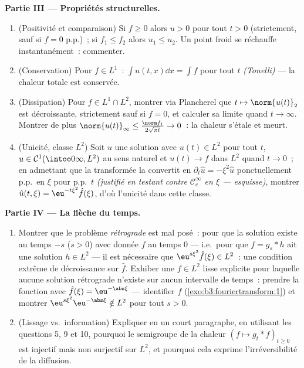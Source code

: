 \begin{problem}[{Problème du week-end --- $\partial_tu =
\partial^2_{xx}u$, résolue de bout en bout}]
\medskip
\noindent\textbf{Partie III --- Propriétés structurelles.}
\begin{enumerate}[resume]
  \item (Positivité et comparaison) Si $f \geq 0$ alors $u >
        0$ pour tout $t > 0$ (strictement, sauf si $f = 0$
        p.p.)~; si $f_1 \leq f_2$ alors $u_1 \leq u_2$. Un
        point froid se réchauffe instantanément~: commenter.
  \item (Conservation) Pour $f \in L^1$~: $\int u(t, x)\dd x =
        \int f$ pour tout $t$ \emph{(Tonelli)} --- la chaleur
        totale est conservée.
  \item (Dissipation) Pour $f \in L^1\cap L^2$, montrer via
        Plancherel que $t \mapsto \norm{u(t)}_2$ est
        décroissante, strictement sauf si $f = 0$, et
        calculer sa limite quand $t \to \infty$. Montrer de
        plus $\norm{u(t)}_\infty \leq \frac{\norm
        f_1}{2\sqrt{\pi t}} \to 0$~: la chaleur s'étale et
        meurt.
  \item (Unicité, classe $L^2$) Soit $u$ une solution avec
        $u(t) \in L^2$ pour tout $t$, $u \in \mathcal
        C^1(\intoo0\infty, L^2)$ au sens naturel et $u(t)
        \to f$ dans $L^2$ quand $t\to0$~; en admettant que la
        transformée la convertit en $\partial_t\hat u =
        -\xi^2\hat u$ ponctuellement p.p.\ en $\xi$ pour
        p.p.\ $t$ \emph{(justifié en testant contre
        $\mathcal C_c^\infty$ en $\xi$ --- esquisse)},
        montrer $\hat u(t,\xi) = \eu^{-t\xi^2}\hat f(\xi)$,
        d'où l'unicité dans cette classe.
\end{enumerate}

\medskip
\noindent\textbf{Partie IV --- La flèche du temps.}
\begin{enumerate}[resume]
  \item Montrer que le problème \emph{rétrograde} est mal
        posé~: pour que la solution existe au temps $-s$ ($s
        > 0$) avec donnée $f$ au temps $0$ --- i.e.\ pour que
        $f = g_s * h$ ait une solution $h \in L^2$ --- il est
        nécessaire que $\eu^{s\xi^2}\hat f(\xi) \in L^2$~:
        une condition extrême de décroissance sur $\hat f$.
        Exhiber une $f \in L^2$ lisse explicite pour laquelle
        aucune solution rétrograde n'existe sur aucun
        intervalle de temps~: prendre la fonction avec $\hat
        f(\xi) = \eu^{-\abs\xi}$ --- identifier $f$
        (\cref{exo:b3:fouriertransform:1}) et montrer
        $\eu^{s\xi^2}\eu^{-\abs\xi} \notin L^2$ pour tout $s
        > 0$.
  \item (Lissage vs.\ information) Expliquer en un court
        paragraphe, en utilisant les questions 5, 9 et 10,
        pourquoi le semigroupe de la chaleur $(f \mapsto g_t
        * f)_{t\geq0}$ est injectif mais non surjectif sur
        $L^2$, et pourquoi cela exprime l'irréversibilité de
        la diffusion.
\end{enumerate}


\end{problem}
